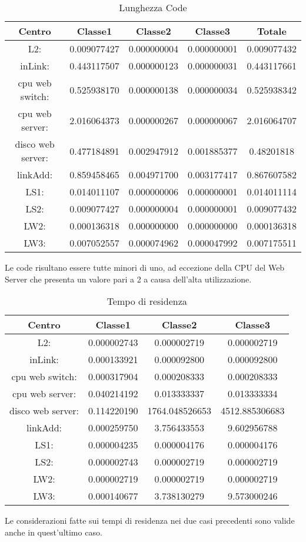 \begin{table}[H]
\begin{center}
\begin{tabular}{||c|c|c|c|c||}
\hline
Centro &Classe1 &Classe2 &Classe3 &Totale\\
\hline
\hline
L2: &0.009077427 &0.000000004 &0.000000001 &0.009077432\\
\hline
inLink: &0.443117507 &0.000000123 &0.000000031 &0.443117661\\
\hline
cpu web switch: &0.525938170 &0.000000138 &0.000000034 &0.525938342\\
\hline
cpu web server: &2.016064373 &0.000000267 &0.000000067 &2.016064707\\
\hline
disco web server: &0.477184891 &0.002947912 &0.001885377 &0.48201818\\
\hline
linkAdd: &0.859458465 &0.004971700 &0.003177417 &0.867607582\\
\hline
LS1: &0.014011107 &0.000000006 &0.000000001 &0.014011114\\
\hline
LS2: &0.009077427 &0.000000004 &0.000000001 &0.009077432\\
\hline
LW2: &0.000136318 &0.000000000 &0.000000000 &0.000136318\\
\hline
LW3: &0.007052557 &0.000074962 &0.000047992 &0.007175511\\
\end{tabular}
\end{center}
\caption{Lunghezza Code}
\label{lunghezzacode}
\end{table}
Le code risultano essere tutte minori di uno, ad eccezione della CPU del Web Server che presenta un valore pari a 2 a causa dell'alta utilizzazione.
\begin{table}[H]
\begin{center}
\begin{tabular}{||c|c|c|c||}
\hline
Centro &Classe1 &Classe2 &Classe3\\
\hline
\hline
L2: &0.000002743 &0.000002719 &0.000002719\\
\hline
inLink: &0.000133921 &0.000092800 &0.000092800\\
\hline
cpu web switch: &0.000317904 &0.000208333 &0.000208333\\
\hline
cpu web server: &0.040214192 &0.013333337 &0.013333334\\
\hline
disco web server: &0.114220190 &1764.048526653 &4512.885306683\\
\hline
linkAdd: &0.000259750 &3.756433553 &9.602956788\\
\hline
LS1: &0.000004235 &0.000004176 &0.000004176\\
\hline
LS2: &0.000002743 &0.000002719 &0.000002719\\
\hline
LW2: &0.000002719 &0.000002719 &0.000002719\\
\hline
LW3: &0.000140677 &3.738130279 &9.573000246\\
\hline
\end{tabular}
\end{center}
\caption{Tempo di residenza}
\label{tempodiresidenza}
\end{table}
Le considerazioni fatte sui tempi di residenza nei due casi precedenti sono valide anche in quest'ultimo caso. 
